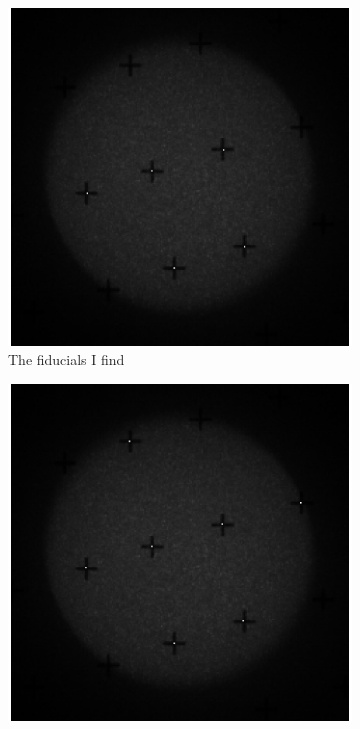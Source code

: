 \documentclass[10pt]{scrartcl}
\begin{document}
\begin{figure} [!h]
    \centering
    \hspace{-1.0in}
    \begin{subfigure}[b]{.45\linewidth}
        \centering
        \includegraphics[width=1.3\textwidth]{../plots_tables_images/myfid.eps}
        \caption{The fiducials I find}
    \end{subfigure}
    \hspace{.5in}
    \begin{subfigure}[b]{.45\linewidth}
        \centering
        \includegraphics[width=1.3\textwidth]{../plots_tables_images/albfid.eps}

\end{subfigure}
\end{figure}
\end{document}
